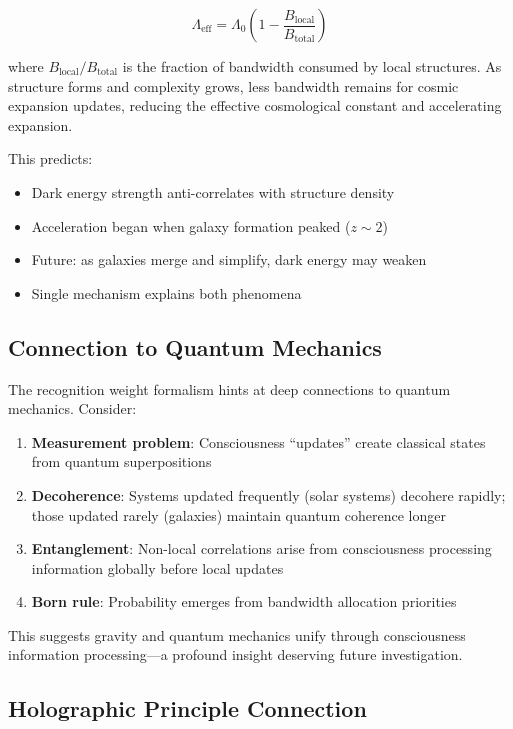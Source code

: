 \documentclass[twocolumn,prd,amsmath,amssymb,aps,superscriptaddress,nofootinbib]{revtex4-2}
\begin{document}
\begin{equation}
\Lambda_{\text{eff}} = \Lambda_0 \left(1 - \frac{B_{\text{local}}}{B_{\text{total}}}\right)
\label{eq:dark_energy}
\end{equation}

where $B_{\text{local}}/B_{\text{total}}$ is the fraction of bandwidth consumed by local structures. As structure forms and complexity grows, less bandwidth remains for cosmic expansion updates, reducing the effective cosmological constant and accelerating expansion.

This predicts:
\begin{itemize}
\item Dark energy strength anti-correlates with structure density
\item Acceleration began when galaxy formation peaked ($z \sim 2$)
\item Future: as galaxies merge and simplify, dark energy may weaken
\item Single mechanism explains both phenomena
\end{itemize}

\subsection{Connection to Quantum Mechanics}

The recognition weight formalism hints at deep connections to quantum mechanics. Consider:

\begin{enumerate}
\item \textbf{Measurement problem}: Consciousness ``updates'' create classical states from quantum superpositions
\item \textbf{Decoherence}: Systems updated frequently (solar systems) decohere rapidly; those updated rarely (galaxies) maintain quantum coherence longer
\item \textbf{Entanglement}: Non-local correlations arise from consciousness processing information globally before local updates
\item \textbf{Born rule}: Probability emerges from bandwidth allocation priorities
\end{enumerate}

This suggests gravity and quantum mechanics unify through consciousness information processing---a profound insight deserving future investigation.

\subsection{Holographic Principle Connection}
\end{document}
